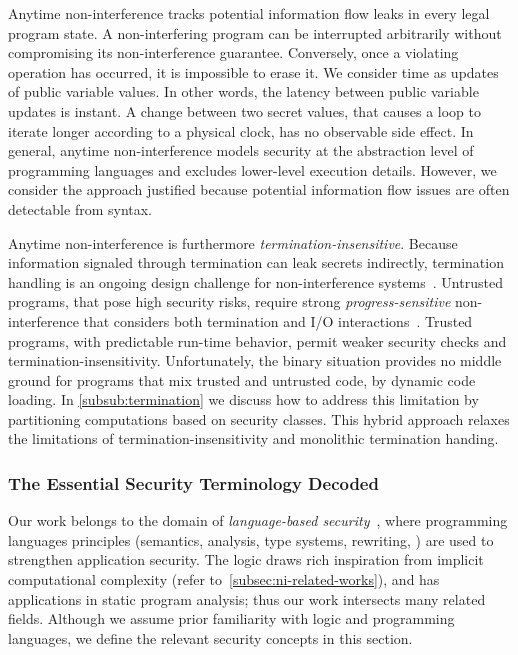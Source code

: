 Anytime non-interference tracks potential information flow leaks in every legal
program state. A non-interfering program can be interrupted arbitrarily without
compromising its non-interference guarantee. Conversely, once a violating
operation has occurred, it is impossible to erase it. We consider time as
updates of public variable values. In other words, the latency between public
variable updates is instant. A change between two secret values, that causes a
loop to iterate longer according to a physical clock, has no observable side
effect. In general, anytime non-interference models security at the abstraction
level of programming languages and excludes lower-level execution details.
However, we consider the approach justified because potential information flow
issues are often detectable from syntax.
 
Anytime non-interference is furthermore \emph{termination-insensitive}. Because
information signaled through termination can leak secrets indirectly,
termination handling is an ongoing design challenge for non-interference
systems~\cite{bay2020}. Untrusted programs, that pose high security risks,
require strong \emph{progress-sensitive} non-interference that considers both
termination and I/O interactions~\cite{hedin2012}. Trusted programs, with
predictable run-time behavior, permit weaker security checks and
termination-insensitivity.
Unfortunately, the binary situation provides no
middle ground for programs that mix trusted and untrusted code, \eg by dynamic
code loading. In \autoref{subsub:termination} we discuss how to address this
limitation by partitioning computations based on security classes. This hybrid
approach relaxes the limitations of termination-insensitivity and monolithic
termination handing.

\subsubsection{The Essential Security Terminology Decoded}
\label{subsubsec:ni-terms}

Our work belongs to the domain of \emph{language-based
security}~\cite{schneider2001,sabelfeld2003}, where programming languages
principles (semantics, analysis, type systems, rewriting, \etc) are used to
strengthen application security. The \lname logic draws rich inspiration from
implicit computational complexity (refer to~\autoref{subsec:ni-related-works}), and
has applications in static program analysis; thus our work intersects many
related fields. Although we assume prior familiarity with logic and programming
languages, we define the relevant security concepts in this section.

